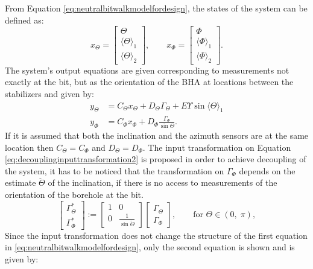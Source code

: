 \documentclass[../main.tex]{subfiles}
\begin{document}
	From Equation \eqref{eq:neutralbitwalkmodelfordesign}, the states of the system can be defined as:	
	\begin{equation}
	x_\Theta = \begin{bmatrix}
	\Theta \\
	\langle \Theta \rangle_1\\
	\langle\Theta \rangle_2 
	\end{bmatrix}, \qquad
	x_\Phi = \begin{bmatrix}
	\Phi \\
	\langle \Phi \rangle_1\\
	\langle\Phi \rangle_2 
	\end{bmatrix}.
	\end{equation}	
	The system's output equations are given corresponding to measurements not exactly at the bit, but as the orientation of the BHA at locations between the stabilizers and given by:	
	\begin{align}
		y_\Theta &= C_\Theta x_\Theta + D_\Theta \Gamma_\Theta + E \Upsilon \sin \langle \Theta \rangle_1 \label{eq:output1}\\
		y_\Phi &= C_\Phi x_\Phi + D_\Phi \frac{\Gamma_\Phi}{\sin \Theta}.\label{eq:output2}		
	\end{align}	
	If it is assumed that both the inclination and the azimuth sensors are at the same location then $C_\Theta = C_\Phi$ and $D_\Theta = D_\Phi$.
	The input transformation on Equation \eqref{eq:decouplinginputtransformation2} is proposed in order to achieve decoupling of the system, it has to be noticed that the transformation on $\Gamma_\Phi$ depends on the estimate $\check{\Theta}$ of the inclination, if there is no access to measurements of the orientation of the borehole at the bit.	
	\begin{equation}
	\begin{bmatrix}
	\Gamma_{\!\Theta}^* \\ \Gamma_{\!\Phi}^* 	
	\end{bmatrix} :=  \begin{bmatrix} 1 & 0 \\ 0 & \frac{1}{\sin \check{\Theta}}\end{bmatrix} \begin{bmatrix}\Gamma_{\!\Theta} \\ \Gamma_{\!\Phi} \end{bmatrix}, \qquad \text{for } \Theta\in (0,\; \pi),
	\label{eq:decouplinginputtransformation2}
	\end{equation}	
	Since the input transformation does not change the structure of the first equation in \eqref{eq:neutralbitwalkmodelfordesign}, only the second equation is shown and is given by:	
\end{document}
